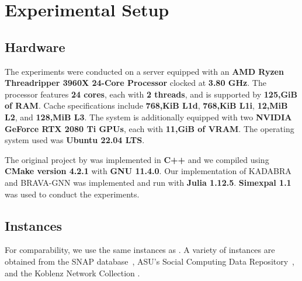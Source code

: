 \chapter{Experimental Setup}


\section{Hardware}

The experiments were conducted on a server equipped with an \textbf{AMD Ryzen Threadripper 3960X 24-Core Processor} clocked at \textbf{3.80 GHz}.
The processor features \textbf{24 cores}, each with \textbf{2 threads}, and is supported by \textbf{125,GiB of RAM}.
Cache specifications include \textbf{768,KiB L1d}, \textbf{768,KiB L1i}, \textbf{12,MiB L2}, and \textbf{128,MiB L3}.
The system is additionally equipped with two \textbf{NVIDIA GeForce RTX 2080 Ti GPUs}, each with \textbf{11,GiB of VRAM}.
The operating system used was \textbf{Ubuntu 22.04 LTS}.

The original project by \textcite{borassi_kadabra_2019} was implemented in \textbf{C++} and we compiled using \textbf{CMake version 4.2.1} with \textbf{GNU 11.4.0}.
Our implementation of KADABRA and BRAVA-GNN was implemented and run with \textbf{Julia 1.12.5}.
\textbf{Simexpal 1.1}~\parencite{simexpal2019} was used to conduct the experiments.

\section[Instances]{Instances}\label{sec:Instances}

For comparability, we use the same instances as \textcite{noauthor_degree-mass_2026}.
A variety of instances are obtained from the SNAP database~\parencite{leskovec_snap_2014},
ASU’s Social Computing Data Repository~\parencite{zafarani_social_2009}, and the Koblenz Network Collection
\parencite{kunegis_konect_2013}.

